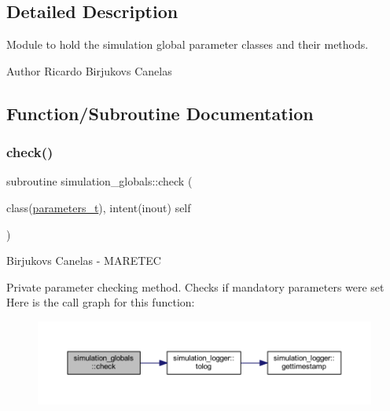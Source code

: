 \subsection{Detailed Description}
Module to hold the simulation global parameter classes and their methods. 

\begin{DoxyAuthor}{Author}
Ricardo Birjukovs Canelas 
\end{DoxyAuthor}


\subsection{Function/\+Subroutine Documentation}
\mbox{\label{namespacesimulation__globals_a3867df0f77dca3700c9470aea24fd048}} 
\subsubsection{\texorpdfstring{check()}{check()}}
{\footnotesize\ttfamily subroutine simulation\+\_\+globals\+::check (\begin{DoxyParamCaption}\item[{class(\mbox{\hyperlink{structsimulation__globals_1_1parameters__t}{parameters\+\_\+t}}), intent(inout)}]{self }\end{DoxyParamCaption})\hspace{0.3cm}{\ttfamily [private]}}



Birjukovs Canelas -\/ M\+A\+R\+E\+T\+EC 

Private parameter checking method. Checks if mandatory parameters were set Here is the call graph for this function\+:
\nopagebreak
\begin{figure}[H]
\begin{center}
\leavevmode
\includegraphics[width=350pt]{namespacesimulation__globals_a3867df0f77dca3700c9470aea24fd048_cgraph}
\end{center}
\end{figure}
\mbox{\label{namespacesimulation__globals_a2c6bf88542c503d1da58280ab3dcf772}} 
